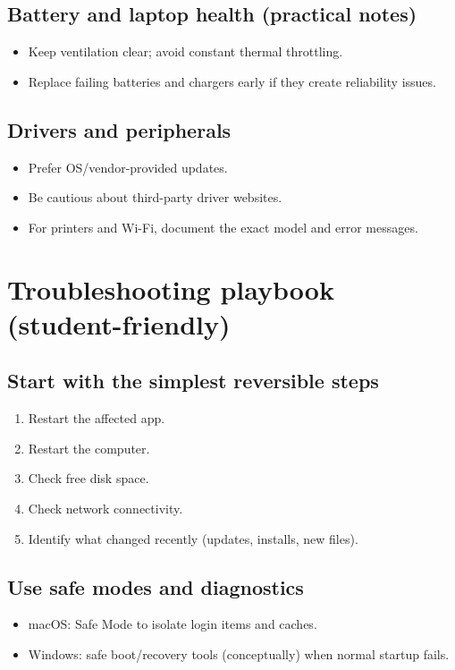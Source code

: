 \subsection{Battery and laptop health (practical notes)}
\begin{itemize}
\item Keep ventilation clear; avoid constant thermal throttling.
\item Replace failing batteries and chargers early if they create reliability issues.
\end{itemize}

\subsection{Drivers and peripherals}
\begin{itemize}
\item Prefer OS/vendor-provided updates.
\item Be cautious about third-party driver websites.
\item For printers and Wi-Fi, document the exact model and error messages.
\end{itemize}

\section{Troubleshooting playbook (student-friendly)}
\subsection{Start with the simplest reversible steps}
\begin{enumerate}
\item Restart the affected app.
\item Restart the computer.
\item Check free disk space.
\item Check network connectivity.
\item Identify what changed recently (updates, installs, new files).
\end{enumerate}

\subsection{Use safe modes and diagnostics}
\begin{itemize}
\item macOS: Safe Mode to isolate login items and caches.
\item Windows: safe boot/recovery tools (conceptually) when normal startup fails.
\end{itemize}

